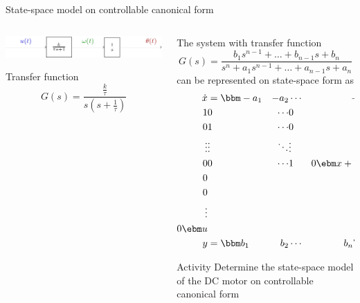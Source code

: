 \documentclass[presentation,aspectratio=169]{beamer}
\begin{document}
\begin{frame}[label={sec:org4239a79}]{State-space model on controllable canonical form}
\begin{columns}
\begin{column}{0.4\columnwidth}
\begin{center}
  \includegraphics[width=\linewidth]{../../figures/block-DC}
\end{center}

Transfer function
\[G(s) = \frac{ \frac{k}{\tau}} {s( s + \frac{1}{\tau})}\]
\end{column}
\begin{column}{0.6\columnwidth}
The system with transfer function
\begin{equation*}
G(s)=\frac{b_1s^{n-1}+\dots+b_{n-1}s+b_n}{s^n+a_1s^{n-1}+\dots
  +a_{n-1}s+a_n}
\end{equation*}
can be represented on state-space form as
\begin{align*}
\dot{x}&=\bbm -a_1& -a_2& \cdots& -a_{n-1}& -a_n\\
1& 0& \cdots& 0& 0\\
0& 1& \cdots& 0& 0\\
\vdots& \vdots& \ddots& \vdots& \vdots\\
0& 0& \cdots& 1& 0\ebm x+
\bbm 1\\ 0\\ 0\\ \vdots\\ 0\ebm u\\
y&=\bbm b_1& b_2& \cdots& b_n\ebm x
\end{align*}

\pause

\alert{Activity} Determine the state-space model of the DC motor on controllable canonical form
\end{column}
\end{columns}
\end{frame}
\end{document}
